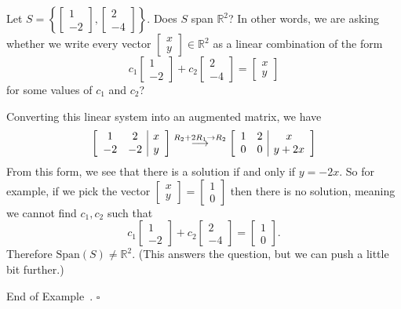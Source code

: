 \documentclass[10pt]{article}
\newenvironment{augmentedmatrix}[1] %
{\left[\begin{array}{#1}}
    {\end{array}\right]}
\theoremstyle{definition}
\newtheorem{example}[theorem]{Example}
\renewenvironment{example}
{\begin{oldexample}}
  {\par\smallskip\hfill   End of Example~\theexample. $\square$    \par\end{oldexample}}
\newcommand{\R}{\mathbb{R}}           %
\newcommand{\Span}{\mathrm{Span}} %
\begin{document}
\begin{example}
  Let $S = \left\{
  \begin{bmatrix}
    1\\-2
  \end{bmatrix},
  \begin{bmatrix}
    2\\-4
  \end{bmatrix}\right\}.$
Does $S$ span $\R^{2}$? In other words, we are asking whether we write every vector $
\begin{bmatrix}
  x\\y
\end{bmatrix}\in \R^{2}
$ as a linear combination of the form
\begin{equation*}
  c_{1}
  \begin{bmatrix}
    1\\-2
  \end{bmatrix}
  +c_{2}
  \begin{bmatrix}
    2\\-4
  \end{bmatrix}
  =
  \begin{bmatrix}
    x\\y
  \end{bmatrix}
\end{equation*}
for some values of $c_{1}$ and $c_{2}$?

Converting this linear system into an augmented matrix, we have
\begin{equation*}
  \begin{augmentedmatrix}{cc|c}
    1&2&x\\
    -2&-2&y
  \end{augmentedmatrix}
  \overset{R_{2}+2R_{1} \to R_{2}}{\longrightarrow}
  \begin{augmentedmatrix}{cc|c}
    1&2&x\\
    0&0&y+2x
  \end{augmentedmatrix}  
\end{equation*}
From this form, we see that there is a solution if and only if $y=-2x$. So for
example, if we pick the vector $
\begin{bmatrix}
  x\\y
\end{bmatrix}=
\begin{bmatrix}
  1\\0
\end{bmatrix}
$
then there is no solution, meaning we cannot find $c_{1},c_{2}$ such that 
\begin{equation*}
  c_{1}
  \begin{bmatrix}
    1\\-2
  \end{bmatrix}
  +c_{2}
  \begin{bmatrix}
    2\\-4
  \end{bmatrix}
  =
  \begin{bmatrix}
    1\\0
  \end{bmatrix}.
\end{equation*}
Therefore $\Span(S)\neq \R^{2}$. (This answers the question, but we can push a
little bit further.)


\end{example}
\end{document}
